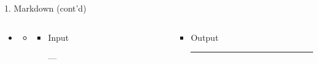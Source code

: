 \documentclass[14pt, aspectratio=169, sectionpage=simple, xclolor=table]{beamer}
\begin{document}
\begin{frame}[fragile, t]{1. Markdown (cont'd)}
\begin{itemize}
\item {}
\begin{itemize}
\item[] 


\begin{columns}
\begin{column}{0.45\textwidth}
\vspace{1cm}
\begin{itemize}
\item Input

\begin{code11}
	---
\end{code11}
\end{itemize}
\end{column}%
\hfill
\begin{column}{0.45\textwidth}
\vspace{0.9cm}
\begin{itemize}
\item Output
\noindent\rule{5cm}{0.4pt}
\end{itemize}
\end{column}%
\end{columns}
\end{itemize}
\end{itemize}




\end{frame}
\end{document}
